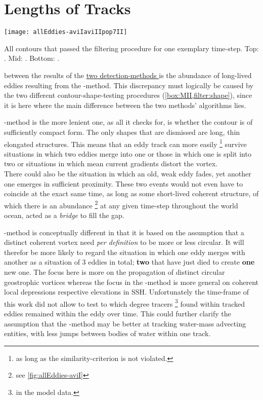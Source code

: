 \label{chap:discussion}

\section{Lengths of Tracks}
\begin{marginfigure}
	\texttt{[image: allEddies-aviIaviIIpop7II]}
	\caption{All contours that passed the filtering procedure for one exemplary time-step. Top: \aviI. Mid: \aviII. Bottom: \popSevenII.}
	\label{fig:allEddies-aviIaviIIpop7II}
\end{marginfigure}
 between the results of the \href{box:MI}{two detection-methods } is the abundance of long-lived eddies resulting from the \MI-method.
This discrepancy must logically be caused by the two different contour-shape-testing procedures (\cref{box:MII,filter:shape}), since it is here where the main difference between the two methods' algorithms lies.

 \MI-method is the more lenient one, as all it checks for, is whether the contour is of sufficiently compact form. The only shapes that are dismissed are long, thin elongated structures. This means that \eg an eddy track can more easily \footnote{as long as the similarity-criterion is not violated.} survive situations in which two eddies merge into one or those in which one is split into two or situations in which mean current gradients distort the vortex.\\ There could also be the situation in which an old, weak eddy fades, yet another one emerges in sufficient proximity. These two events would not even have to coincide at the exact same time, as long as some short-lived coherent structure, of which there is an abundance \footnote{see \cref{fig:allEddies-aviI}} at any given time-step throughout the world ocean, acted as a \textit{bridge} to fill the gap.

 \MII-method is conceptually different in that it is based on the assumption that a distinct coherent vortex need \textit{per definition} to be more or less circular. It will therefor be more likely to regard \eg the situation in which one eddy merges with another as a situation of 3 eddies in total; \textbf{two} that have just died to create \textbf{one} new one.
The focus here is more on the propagation of distinct circular geostrophic vortices whereas the focus in the \MI-method is more general on coherent local depressions respective elevations in SSH. Unfortunately the time-frame of this work did not allow to test to which degree tracers \footnote{in the model data.} found within tracked eddies remained within the eddy over time. This could further clarify the assumption that the \MI-method may be better at tracking water-mass advecting entities, with less jumps between bodies of water within one track.


